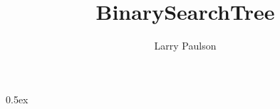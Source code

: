 \documentclass[11pt,a4paper]{article}
\begin{document}
\title{BinarySearchTree}
\author{Larry Paulson}
\maketitle

\tableofcontents

\parindent 0pt\parskip 0.5ex


\end{document}
